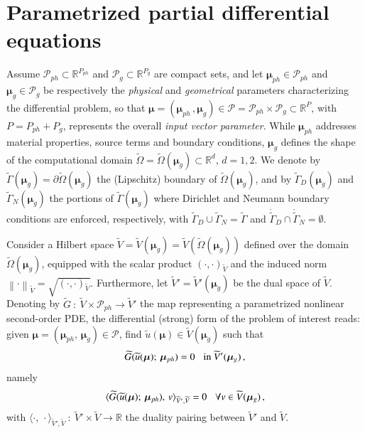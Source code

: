 \documentclass[longtitle]{elsarticle}
\numberwithin{equation}{section}
\theoremstyle{theorem}
\theoremstyle{definition}
\theoremstyle{remark}
\theoremstyle{proposition}
\numberwithin{figure}{section}
\newcommand{\norm}[1]{\left\lVert#1\right\rVert}
\newcommand{\wt}[1]{\widetilde{#1}}
\newcommand{\bg}[1]{\boldsymbol{#1}}
\begin{document}
		
		
	\section{Parametrized partial differential equations}
	\label{section:Parametrized partial differential equations}
	
		Assume $\mathcal{P}_{ph} \subset \mathbb{R}^{P_{ph}}$ and $\mathcal{P}_g \subset \mathbb{R}^{P_{g}}$ are compact sets, and let $\boldsymbol{\mu}_{ph} \in \mathcal{P}_{ph}$ and $\boldsymbol{\mu}_{g} \in \mathcal{P}_{g}$ be respectively the \emph{physical} and \emph{geometrical} parameters characterizing the differential problem, so that $\boldsymbol{\mu} = (\boldsymbol{\mu}_{ph} \, , \boldsymbol{\mu}_{g}) \in \mathcal{P} = \mathcal{P}_{ph} \times \mathcal{P}_g \subset \mathbb{R}^P$, with $P = P_{ph} + P_g$, represents the overall \emph{input vector parameter}. While $\bg{\mu}_{ph}$ addresses material properties, source terms and boundary conditions, $\bg{\mu}_g$ defines the shape of the computational domain $\wt{\Omega} = \wt{\Omega}(\boldsymbol{\mu}_g) \subset \mathbb{R}^d$, $d = 1,2$. We denote by $\wt{\Gamma}(\boldsymbol{\mu}_g) = \partial \wt{\Omega}(\boldsymbol{\mu}_g)$ the (Lipschitz) boundary of $\wt{\Omega}(\boldsymbol{\mu}_g)$, and by $\wt{\Gamma}_D(\boldsymbol{\mu}_g)$ and $\wt{\Gamma}_N(\boldsymbol{\mu}_g)$ the portions of $\wt{\Gamma}(\boldsymbol{\mu}_g)$ where Dirichlet and Neumann boundary conditions are enforced, respectively, with $\wt{\Gamma}_D \cup \wt{\Gamma}_N = \wt{\Gamma}$ and $\mathring{\wt{\Gamma}}_D \cap \mathring{\wt{\Gamma}}_N = \emptyset$.
		
		Consider a Hilbert space $\wt{V} = \wt{V}(\bg{\mu}_g) = \wt{V}(\wt{\Omega}(\boldsymbol{\mu}_g))$ defined over the domain $\wt{\Omega}(\boldsymbol{\mu}_g)$, equipped with the scalar product $(\cdot, \cdot)_{\wt{V}}$ and the induced norm $\norm{\cdot}_{\wt{V}} = \sqrt{(\cdot, \cdot)_{\wt{V}}}$. Furthermore, let $\wt{V}' = \wt{V}'(\boldsymbol{\mu}_g)$ be the dual space of $\wt{V}$. Denoting by $\wt{G} ~ : ~ \wt{V} \times \mathcal{P}_{ph} \rightarrow \wt{V}'$ the map representing a parametrized nonlinear second-order PDE, the differential (strong) form of the problem of interest reads: given $\bg{\mu} = (\bg{\mu}_{ph}, \, \bg{\mu}_g) \in \mathcal{P}$, find $\wt{u}(\boldsymbol{\mu}) \in \wt{V}(\bg{\mu}_g)$ such that
		\begin{equation}
			\label{eq:pde-differential-form}
			\wt{G}(\wt{u}(\bg{\mu}); \, \bg{\mu}_{ph}) = 0 \hspace*{0.3cm} \text{in $\wt{V}'(\bg{\mu}_g)$} \, ,
		\end{equation}
		namely
		\begin{equation*}
			\langle \wt{G}(\wt{u}(\bg{\mu}); \, \bg{\mu}_{ph}), \, v \rangle_{\wt{V}',\wt{V}} = 0 \hspace*{0.3cm} \forall v \in \wt{V}(\bg{\mu}_g) \, ,
		\end{equation*}
		with $\langle \cdot, \, \cdot \rangle_{\wt{V}',\wt{V}} ~ : ~ \wt{V}' \times \wt{V} \rightarrow \mathbb{R}$ the duality pairing between $\wt{V}'$ and $\wt{V}$. 		
\end{document}
